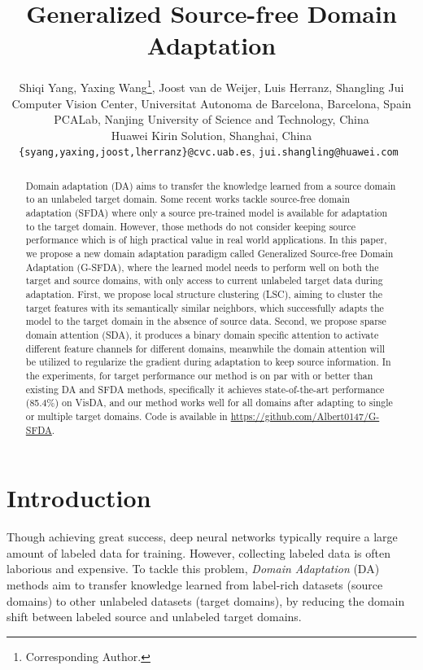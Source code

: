 \documentclass[10pt,twocolumn,letterpaper]{article}
\begin{document}
\title{Generalized Source-free Domain Adaptation}

\author{Shiqi Yang, Yaxing Wang\thanks{Corresponding Author.}, Joost van de Weijer, Luis Herranz, Shangling Jui\\
 Computer Vision Center, Universitat Autonoma de Barcelona, Barcelona, Spain\\
 PCALab, Nanjing University of Science and Technology, China\\
 Huawei Kirin Solution, Shanghai, China\\
{\tt\small \{syang,yaxing,joost,lherranz\}@cvc.uab.es}, \tt\small{jui.shangling@huawei.com}
}

\maketitle
\ificcvfinal\thispagestyle{empty}\fi

\begin{abstract}
   Domain adaptation (DA) aims to transfer the knowledge learned from a source domain to an unlabeled target domain. Some recent works tackle source-free domain adaptation (SFDA) where only a source pre-trained model is available for adaptation to the target domain. However, those methods do not consider keeping source performance which is of high practical value in real world applications. In this paper, we propose a new domain adaptation paradigm called Generalized Source-free Domain Adaptation (G-SFDA), where the learned model needs to perform well on both the target and source domains, with only access to current unlabeled target data during adaptation. First, we propose local structure clustering (LSC), aiming to cluster the target features with its semantically similar neighbors, which successfully adapts the model to the target domain in the absence of source data. Second, we propose sparse domain attention (SDA), it produces a binary domain specific attention to activate different feature channels for different domains, meanwhile the domain attention will be utilized to regularize the gradient during adaptation to keep source information.  In the experiments, for target performance our method is on par with or better than existing DA and SFDA methods, specifically it achieves state-of-the-art performance (85.4\%) on VisDA, and our method works well for all domains after adapting to single or multiple target domains. Code is available in \url{https://github.com/Albert0147/G-SFDA}.
\end{abstract}

\section{Introduction}
Though achieving great success, deep neural networks typically require a large amount of labeled data for training. However, collecting labeled data is often laborious and expensive. To tackle this problem, \textit{Domain Adaptation} (DA) methods aim to transfer knowledge learned from label-rich datasets (source domains) to other unlabeled datasets (target domains), by reducing the domain shift between labeled source and unlabeled target domains. 
\end{document}
